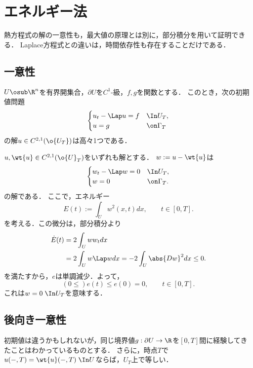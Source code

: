 \documentclass[uplatex,dvipdfmx]{jsreport}
\begin{document}
\section{エネルギー法}

\begin{tcolorbox}[colframe=ForestGreen, colback=ForestGreen!10!white,breakable,colbacktitle=ForestGreen!40!white,coltitle=black,fonttitle=\bfseries\sffamily,
title=]
    熱方程式の解の一意性も，最大値の原理とは別に，部分積分を用いて証明できる．
    Laplace方程式との違いは，時間依存性も存在することだけである．
\end{tcolorbox}

\subsection{一意性}

\begin{theorem}
    $U\osub\R^n$を有界開集合，$\partial U$を$C^1$-級，$f,g$を関数とする．
    このとき，次の初期値問題
    \[\begin{cases}
        u_t-\Lap u=f&\In U_T,\\
        u=g&\on \Gamma_T
    \end{cases}\]
    の解$u\in C^{2,1}(\o{U_T})$は高々1つである．
\end{theorem}
\begin{Proof}
    $u,\wt{u}\in C^{2,1}(\o{U}_T)$をいずれも解とする．
    $w:=u-\wt{u}$は
    \[\begin{cases}
        w_t-\Lap w=0&\In U_T,\\
        w=0&\on \Gamma_T.
    \end{cases}\]
    の解である．
    ここで，エネルギー
    \[E(t):=\int_Uw^2(x,t)dx,\qquad t\in[0,T].\]
    を考える．この微分は，部分積分より
    \begin{align*}
        \dot{E}(t)&=2\int_Uww_tdx\\
        &=2\int_Uw\Lap wdx=-2\int_U\abs{Dw}^2dx\le0.
    \end{align*}
    を満たすから，$e$は単調減少．よって，
    \[(0\le)e(t)\le e(0)=0,\qquad t\in[0,T].\]
    これは$w=0\;\In U_T$を意味する．
\end{Proof}

\subsection{後向き一意性}

\begin{tcolorbox}[colframe=ForestGreen, colback=ForestGreen!10!white,breakable,colbacktitle=ForestGreen!40!white,coltitle=black,fonttitle=\bfseries\sffamily,
title=]
    初期値は違うかもしれないが，同じ境界値$g:\partial U\to\R$を$[0,T]$間に経験してきたことはわかっているものとする．
    さらに，時点$T$で$u(-,T)=\wt{u}(-,T)\;\In U$ならば，$U_T$上で等しい．
\end{tcolorbox}
\end{document}
